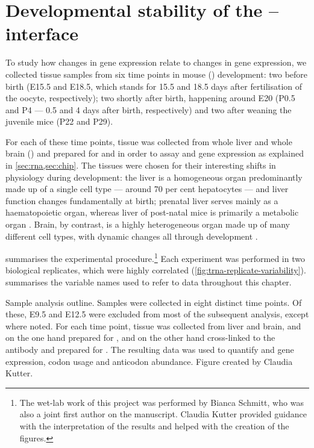 \chapter{Developmental stability of the -- interface}
\label{sec:trna}

To study how changes in \mrna gene expression relate to changes in \trna gene
expression, we collected tissue samples from six time points in mouse (\mmu)
development: two before birth (E15.5 and E18.5, which stands for \num{15.5} and
\num{18.5} days after fertilisation of the oocyte, respectively); two shortly
after birth, happening around E20 (P0.5 and P4 --- \num{0.5} and \num{4} days
after birth, respectively) and two after weaning the juvenile mice (P22 and
P29).

For each of these time points, tissue was collected from whole liver and whole
brain () and prepared for \rnaseq and  \chipseq in order to
assay \mrna and \trna gene expression as explained in
\cref{sec:rna,sec:chip}. The tissues were chosen for their
interesting shifts in physiology during development: the liver is a homogeneous
organ predominantly made up of a single cell type --- around \num{70} per cent
hepatocytes --- and liver function changes fundamentally at birth; prenatal
liver serves mainly as a haematopoietic organ, whereas liver of post-natal mice
is primarily a metabolic organ \citep{Si-Tayeb:2010}. Brain, by contrast, is a
highly heterogeneous organ made up of many different cell types, with dynamic
changes all through development \citep{Liscovitch:2013}.

 summarises the experimental
procedure.\footnote{The wet-lab work of this project was performed by Bianca
Schmitt, who was also a joint first author on the manuscript. Claudia Kutter
provided guidance with the interpretation of the results and helped with the
creation of the figures.} Each experiment was performed in two biological
replicates, which were highly correlated
(\cref{fig:trna-replicate-variability}).  summarises the
variable names used to refer to data throughout this chapter.

    {Sample analysis outline.}
    {Samples were collected in eight distinct time points. Of these, E9.5 and
    E12.5 were excluded from most of the subsequent analysis, except where
    noted. For each time point, tissue was collected from liver and brain, and
    on the one hand prepared for \rnaseq, and on the other hand cross-linked to
    the  antibody and prepared for \chipseq. The resulting data was used to
    quantify \mrna and \trna gene expression, codon usage and \trna anticodon
    abundance. Figure created by Claudia Kutter.}

